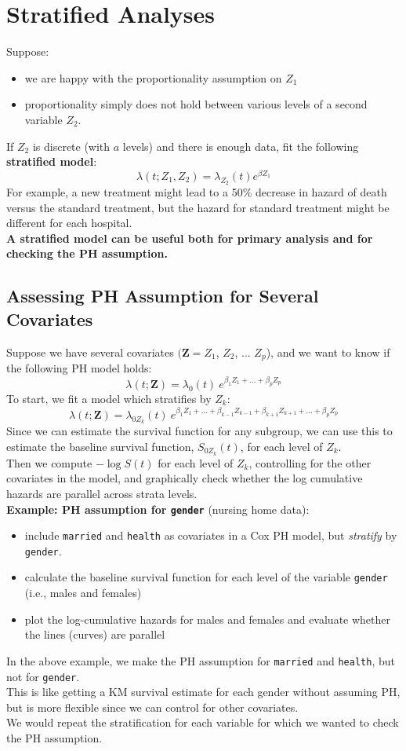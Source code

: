 \documentclass[11pt,psfig]{book}
\begin{document}
\section{Stratified Analyses}
Suppose:
\begin{itemize}
\item we are happy with the proportionality assumption on $Z_1$
\item proportionality simply does not hold between various
levels of a second variable  $Z_2$.
\end{itemize}
If $Z_2$ is discrete (with $a$ levels) and there is enough data,
fit the following {\bf stratified model}:
\[   \lambda(t; Z_1, Z_2)  = \lambda_{Z_2}(t) e^{\beta Z_1} \]
For example, a new treatment might lead to a 50\% decrease
in hazard of death versus the standard treatment, but the
hazard for standard treatment might be different for
each hospital.
\\[2ex]
{\bf A stratified model can be useful both for primary analysis
and for checking the PH assumption.}
\subsection{Assessing PH Assumption for Several Covariates}
Suppose we have several covariates $(\mathbf{Z}=  Z_1$,  $Z_2$, ... $Z_p$),
and we want to know if the following PH model holds:
\[ \lambda(t; {\mathbf{Z}})  = \lambda_0(t)~ e^{\beta_1 Z_1 + ... + \beta_p Z_p} \]
To start, we fit a model which stratifies by $Z_k$:
\[ \lambda(t; {\mathbf{Z}})  = \lambda_{0Z_k}(t) ~e^{\beta_1 Z_1 + ... +
\beta_{k-1} Z_{k-1} + \beta_{k+1} Z_{k+1} +...+ \beta_p Z_p} \]
Since we can estimate the survival function for any subgroup, we can
use this to estimate the baseline survival function,
$S_{0Z_k}(t)$, for each level of $Z_k$.
\\[2ex]
Then we compute $- \log S(t)$ for each level of $Z_k$,
controlling for the other covariates in the model, and
graphically check whether the log cumulative hazards are parallel
across strata levels.
\\[2ex]
{\bf Example: PH assumption for {\tt gender}} (nursing home data):
\begin{itemize}
\item  include {\tt married} and {\tt health} as covariates in
a Cox PH model, but {\em stratify} by {\tt gender}.
\item calculate the baseline survival function for each level of
the variable {\tt gender} (i.e., males and females)
\item  plot the log-cumulative hazards for males and females and
evaluate whether the lines (curves) are parallel
\end{itemize}
In the above example, we make the PH assumption for {\tt married} and
{\tt health}, but not for {\tt gender}.
\\[2ex]
This is like getting a KM survival estimate for each gender without
assuming PH, but is more flexible since we can control for other covariates.
\\[2ex]
We would repeat the stratification for each variable for which we
wanted to check the PH assumption.
\end{document}
